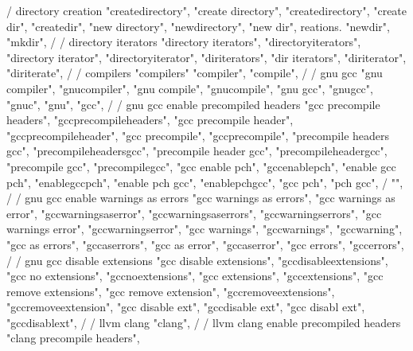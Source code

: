 {{{{{{{        / directory creation
        "createdirectory",  
        "create directory",  
        "createdirectory",  
        "create dir",  
        "createdir",  
        "new directory",  
        "newdirectory",  
        "new dir", reations. 
        "newdir",  
        "mkdir",  
        /
        / directory iterators 
        "directory iterators",  
        "directoryiterators",  
        "directory iterator",  
        "directoryiterator",  
        "diriterators",  
        "dir iterators",  
        "diriterator",  
        "diriterate",  
        /
        / compilers 
        "compilers"
        "compiler",
        "compile",
        /
        / gnu gcc
        "gnu compiler",
        "gnucompiler",
        "gnu compile",
        "gnucompile",
        "gnu gcc",
        "gnugcc",
        "gnuc",
        "gnu",
        "gcc",
        /
        / gnu gcc enable precompiled headers
        "gcc precompile headers",  
        "gccprecompileheaders",  
        "gcc precompile header",  
        "gccprecompileheader",  
        "gcc precompile",  
        "gccprecompile",  
        "precompile headers gcc",  
        "precompileheadersgcc",  
        "precompile header gcc",  
        "precompileheadergcc",  
        "precompile gcc",  
        "precompilegcc",  
        "gcc enable pch",  
        "gccenablepch",  
        "enable gcc pch",  
        "enablegccpch",  
        "enable pch gcc",  
        "enablepchgcc",  
        "gcc pch",  
        "pch gcc",  
        / {"", 
        /
        / gnu gcc enable warnings as errors
        "gcc warnings as errors", 
        "gcc warnings as error", 
        "gccwarningsaserror", 
        "gccwarningsaserrors", 
        "gccwarningserrors", 
        "gcc warnings error", 
        "gccwarningserror", 
        "gcc warnings", 
        "gccwarnings", 
        "gccwarning", 
        "gcc as errors", 
        "gccaserrors", 
        "gcc as error", 
        "gccaserror", 
        "gcc errors", 
        "gccerrors", 
        /
        / gnu gcc disable extensions 
        "gcc disable extensions", 
        "gccdisableextensions", 
        "gcc no extensions", 
        "gccnoextensions", 
        "gcc extensions", 
        "gccextensions", 
        "gcc remove extensions", 
        "gcc remove extension", 
        "gccremoveextensions", 
        "gccremoveextension", 
        "gcc disable ext", 
        "gccdisable ext", 
        "gcc disabl ext", 
        "gccdisablext", 
        /
        / llvm clang 
        "clang",  
        /
        / llvm clang enable precompiled headers 
        "clang precompile headers",  
}}}}}}}}
